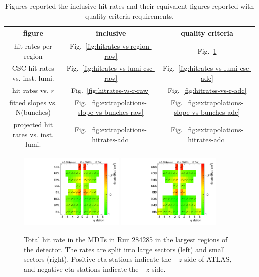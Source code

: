 \begin{table}
  \begin{center}
    \renewcommand{\arraystretch}{1.4}
    \begin{tabular}{c|c|c}
      figure                              & inclusive                                     & quality criteria \\
      \hline
      hit rates per region                & Fig.~\ref{fig:hitrates-vs-region-raw}              & Fig.~\ref{fig:hitrates-vs-region-adc} \\
      CSC hit rates vs. inst. lumi.       & Fig.~\ref{fig:hitrates-vs-lumi-csc-raw}            & Fig.~\ref{fig:hitrates-vs-lumi-csc-adc} \\
      hit rates vs. $r$                   & Fig.~\ref{fig:hitrates-vs-r-raw}                   & Fig.~\ref{fig:hitrates-vs-r-adc} \\
      fitted slopes vs. N(bunches)        & Fig.~\ref{fig:extrapolations-slope-vs-bunches-raw} & Fig.~\ref{fig:extrapolations-slope-vs-bunches-adc} \\
      projected hit rates vs. inst. lumi. & Fig.~\ref{fig:extrapolations-hitrates-adc}         & Fig.~\ref{fig:extrapolations-hitrates-adc} \\
    \end{tabular}
    \caption{Figures reported the inclusive hit rates and their equivalent figures reported with quality criteria requirements.}
    \label{tab:electronic-rawvsadc}
  \end{center}
\end{table}

\begin{figure}
  \begin{center}
    \includegraphics[width=0.45\textwidth]{./figures/rate_adc_vs_region_L_00284285.pdf}
    \includegraphics[width=0.45\textwidth]{./figures/rate_adc_vs_region_S_00284285.pdf}
    \caption{Total hit rate in the MDTs in Run 284285 in the largest regions of the detector. The rates are split into large sectors (left) and small sectors (right). Positive eta stations indicate the $+z$ side of ATLAS, and negative eta stations indicate the $-z$ side.}
    \label{fig:hitrates-vs-region-adc}
  \end{center}
\end{figure}

